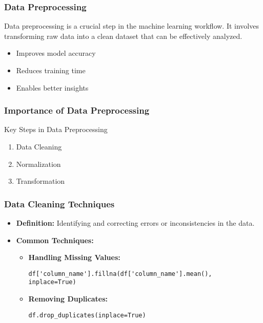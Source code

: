\documentclass[aspectratio=169]{beamer}
\begin{document}
\begin{frame}
    \frametitle{Data Preprocessing}
    Data preprocessing is a crucial step in the machine learning workflow. It involves transforming raw data into a clean dataset that can be effectively analyzed.
    \begin{itemize}
        \item Improves model accuracy
        \item Reduces training time
        \item Enables better insights
    \end{itemize}
\end{frame}

\begin{frame}
    \frametitle{Importance of Data Preprocessing}
    \begin{block}{Key Steps in Data Preprocessing}
        \begin{enumerate}
            \item Data Cleaning
            \item Normalization
            \item Transformation
        \end{enumerate}
    \end{block}
\end{frame}

\begin{frame}[fragile]
    \frametitle{Data Cleaning Techniques}
    \begin{itemize}
        \item \textbf{Definition:} Identifying and correcting errors or inconsistencies in the data.
        \item \textbf{Common Techniques:}
        \begin{itemize}
            \item \textbf{Handling Missing Values:}
            \begin{lstlisting}
df['column_name'].fillna(df['column_name'].mean(), inplace=True)
            \end{lstlisting}
            \item \textbf{Removing Duplicates:}
            \begin{lstlisting}
df.drop_duplicates(inplace=True)
            \end{lstlisting}
        \end{itemize}
    \end{itemize}
\end{frame}
\end{document}
